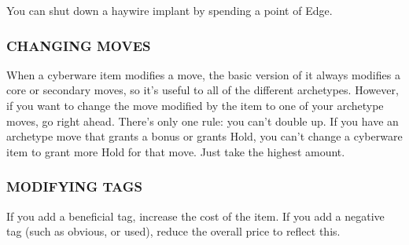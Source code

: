 \documentclass[oneside,10pt]{article}
\begin{document}
\begin{multicols}{2}
\begin{dent}
\begin{dent}
\tcirc{} You can shut down a haywire implant by spending a
point of Edge.
\end{dent}
\end{dent}
\subsubsection{CHANGING MOVES}
When a cyberware item modifies a move, the basic version of
it always modifies a core or secondary moves, so it’s useful
to all of the different archetypes. However, if you want to
change the move modified by the item to one of your archetype moves, go right ahead. There’s only one rule: you can’t
double up. If you have an archetype move that grants a bonus
or grants Hold, you can’t change a cyberware item to grant
more Hold for that move. Just take the highest amount.

\subsubsection{MODIFYING TAGS}
If you add a beneficial tag, increase the cost of the item. If
you add a negative tag (such as obvious, or used), reduce the
overall price to reflect this.

\end{multicols}

\end{document}
